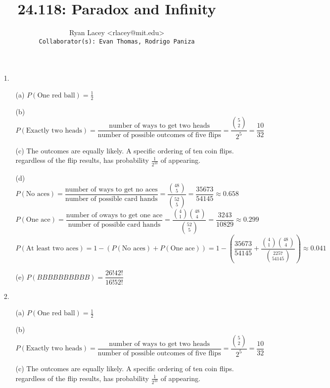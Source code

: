 \documentclass{article}
\begin{document}

\title{24.118: Paradox and Infinity}
\author{
  Ryan Lacey <rlacey@mit.edu>\\
  \footnotesize \texttt{Collaborator(s): Evan Thomas, Rodrigo Paniza}
}
        
\maketitle
        


\begin{enumerate}
\item[1.]
	\begin{enumerate}
	\item[(a)] 
			$P(\text{One red ball}) = \frac{1}{2}$
	\item[(b)] 
			$P(\text{Exactly two heads}) = \dfrac{\text{number of ways to get two heads}}{\text{number of possible outcomes of five flips}} = \dfrac{\binom{5}{2}}{2^5} = \dfrac{10}{32}$
	\item[(c)] 
			The outcomes are equally likely. A specific ordering of ten coin flips. regardless of the flip results, has probability $\frac{1}{2^{10}}$ of appearing.
	\item[(d)] 
			$P(\text{No aces})= \dfrac{\text{number of ways to get no aces}}{\text{number of possible card hands}} = \dfrac{\binom{48}{5}}{\binom{52}{5}} = \dfrac{35673}{54145} \approx 0.658$\\
			
			$P(\text{One ace})= \dfrac{\text{number of oways to get one ace}}{\text{number of possible card hands}} = \dfrac{\binom{4}{1}\binom{48}{4}}{\binom{52}{5}} = \dfrac{3243}{10829} \approx 0.299$\\
			
			$P(\text{At least two aces})= 1 - \left(P(\text{No aces}) + P(\text{One ace})\right) = 1 - \left(\dfrac{35673}{54145} + \dfrac{\binom{4}{1}\binom{48}{4}}{\binom{2257}{54145}} \right) \approx 0.041$
	\item[(e)] 
			$P(B B B B B B B B B B) = \displaystyle\dfrac{26!42!}{16!52!}$\\			
	\end{enumerate}

\bigskip

\item[2.]
	\begin{enumerate}
	\item[(a)] 
			$P(\text{One red ball}) = \frac{1}{2}$
	\item[(b)] 
			$P(\text{Exactly two heads}) = \dfrac{\text{number of ways to get two heads}}{\text{number of possible outcomes of five flips}} = \dfrac{\binom{5}{2}}{2^5} = \dfrac{10}{32}$
	\item[(c)] 
			The outcomes are equally likely. A specific ordering of ten coin flips. regardless of the flip results, has probability $\frac{1}{2^{10}}$ of appearing.\\		
	\end{enumerate}

\end{enumerate}
\end{document}
